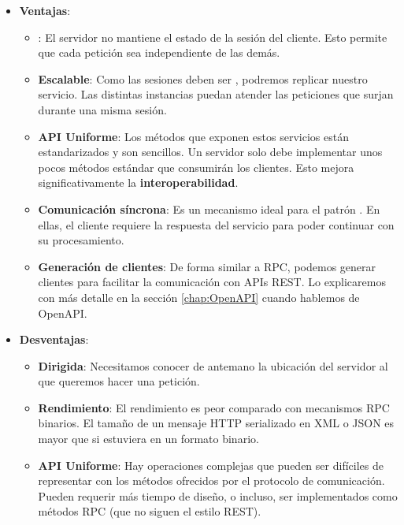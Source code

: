 \begin{itemize}
  \item \textbf{Ventajas}:

  \begin{itemize}
    \item \textbf{}: El servidor no mantiene el estado de la sesión del cliente. Esto permite que cada petición sea independiente de las demás.

    \item \textbf{Escalable}: Como las sesiones deben ser , podremos replicar nuestro servicio. Las distintas instancias puedan atender las peticiones que surjan durante una misma sesión.

    \item \textbf{API Uniforme}: Los métodos que exponen estos servicios están estandarizados y son sencillos. Un servidor solo debe implementar unos pocos métodos estándar que consumirán los clientes. Esto mejora significativamente la \textbf{interoperabilidad}.

    \item \textbf{Comunicación síncrona}: Es un mecanismo ideal para el patrón . En ellas, el cliente requiere la respuesta del servicio para poder continuar con su procesamiento.

    \item \textbf{Generación de clientes}: De forma similar a RPC, podemos generar clientes para facilitar la comunicación con APIs REST. Lo explicaremos con más detalle en la sección \ref{chap:OpenAPI} cuando hablemos de OpenAPI.
  \end{itemize}

  \item \textbf{Desventajas}:

  \begin{itemize}
    \item \textbf{Dirigida}: Necesitamos conocer de antemano la ubicación del servidor al que queremos hacer una petición.

    \item \textbf{Rendimiento}: El rendimiento es peor comparado con mecanismos RPC binarios. El tamaño de un mensaje HTTP serializado en XML o JSON es mayor que si estuviera en un formato binario.

    \item \textbf{API Uniforme}: Hay operaciones complejas que pueden ser difíciles de representar con los métodos ofrecidos por el protocolo de comunicación. Pueden requerir más tiempo de diseño, o incluso, ser implementados como métodos RPC (que no siguen el estilo REST).
  \end{itemize}
\end{itemize}

